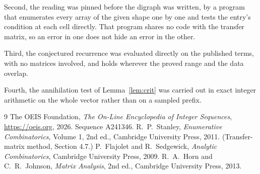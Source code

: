 \documentclass[11pt,a4paper]{article}
\theoremstyle{plain}
\theoremstyle{definition}
\begin{document}
Second, the reading was pinned before the digraph was written, by a program that enumerates
every array of the given shape one by one and tests the entry's condition at each cell
directly. That program shares no code with the transfer matrix, so an error in one does not
hide an error in the other.

Third, the conjectured recurrence was evaluated directly on the published terms, with no
matrices involved, and holds wherever the proved range and the data overlap.

Fourth, the annihilation test of Lemma~\ref{lem:crit} was carried out in exact integer
arithmetic on the whole vector rather than on a sampled prefix.

\begin{thebibliography}{9}
 The OEIS Foundation, \emph{The On-Line Encyclopedia of Integer
Sequences}, \url{https://oeis.org}, 2026. Sequence A241346.
 R.~P.~Stanley, \emph{Enumerative Combinatorics}, Volume 1, 2nd ed.,
Cambridge University Press, 2011. (Transfer-matrix method, Section 4.7.)
 P.~Flajolet and R.~Sedgewick, \emph{Analytic Combinatorics}, Cambridge
University Press, 2009.
 R.~A.~Horn and C.~R.~Johnson, \emph{Matrix Analysis}, 2nd ed., Cambridge
University Press, 2013.
\end{thebibliography}
\end{document}
